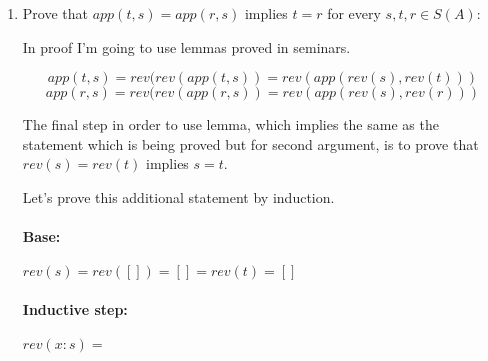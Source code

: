 \documentclass{article}
\begin{document}
\begin{enumerate}
\begin{enumerate}
\end{enumerate}

\item Prove that $app(t, s) = app(r, s)$ implies $t = r$ for every $s, t, r \in S(A)$:

In proof I'm going to use lemmas proved in seminars.

\[app(t, s) = rev(rev(app(t, s)) = rev(app(rev(s), rev(t)))\]
\[app(r, s) = rev(rev(app(r, s)) = rev(app(rev(s), rev(r)))\]

The final step in order to use lemma, which implies the same as the statement which is being proved but for second argument, is to prove that $rev(s) = rev(t)$ implies $s = t$.

Let's prove this additional statement by induction.

\paragraph{Base:} $rev(s) = rev([]) = [] = rev(t) = []$
\paragraph{Inductive step:} $rev(x : s) = $ 

\end{enumerate}
\end{document}
